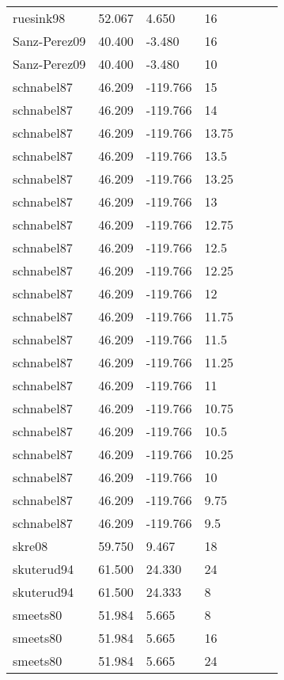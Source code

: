 \documentclass{article}
\begin{document}
\begin{table}[ht]
\begin{tabular}{|p{}|p{}|p{}|p{}|p{}|p{}|p{}|}
  ruesink98 & 52.067 & 4.650 & 16 &  &  &  \\ 
  Sanz-Perez09 & 40.400 & -3.480 & 16 &  &  &  \\ 
  Sanz-Perez09 & 40.400 & -3.480 & 10 &  &  &  \\ 
  schnabel87 & 46.209 & -119.766 & 15 &  &  &  \\ 
  schnabel87 & 46.209 & -119.766 & 14 &  &  &  \\ 
  schnabel87 & 46.209 & -119.766 & 13.75 &  &  &  \\ 
  schnabel87 & 46.209 & -119.766 & 13.5 &  &  &  \\ 
  schnabel87 & 46.209 & -119.766 & 13.25 &  &  &  \\ 
  schnabel87 & 46.209 & -119.766 & 13 &  &  &  \\ 
  schnabel87 & 46.209 & -119.766 & 12.75 &  &  &  \\ 
  schnabel87 & 46.209 & -119.766 & 12.5 &  &  &  \\ 
  schnabel87 & 46.209 & -119.766 & 12.25 &  &  &  \\ 
  schnabel87 & 46.209 & -119.766 & 12 &  &  &  \\ 
  schnabel87 & 46.209 & -119.766 & 11.75 &  &  &  \\ 
  schnabel87 & 46.209 & -119.766 & 11.5 &  &  &  \\ 
  schnabel87 & 46.209 & -119.766 & 11.25 &  &  &  \\ 
  schnabel87 & 46.209 & -119.766 & 11 &  &  &  \\ 
  schnabel87 & 46.209 & -119.766 & 10.75 &  &  &  \\ 
  schnabel87 & 46.209 & -119.766 & 10.5 &  &  &  \\ 
  schnabel87 & 46.209 & -119.766 & 10.25 &  &  &  \\ 
  schnabel87 & 46.209 & -119.766 & 10 &  &  &  \\ 
  schnabel87 & 46.209 & -119.766 & 9.75 &  &  &  \\ 
  schnabel87 & 46.209 & -119.766 & 9.5 &  &  &  \\ 
  skre08 & 59.750 & 9.467 & 18 &  &  &  \\ 
  skuterud94 & 61.500 & 24.330 & 24 &  &  &  \\ 
  skuterud94 & 61.500 & 24.333 & 8 &  &  &  \\ 
  smeets80 & 51.984 & 5.665 & 8 &  &  &  \\ 
  smeets80 & 51.984 & 5.665 & 16 &  &  &  \\ 
  smeets80 & 51.984 & 5.665 & 24 &  &  &  \\ 

\end{tabular}
\end{table}
\end{document}
